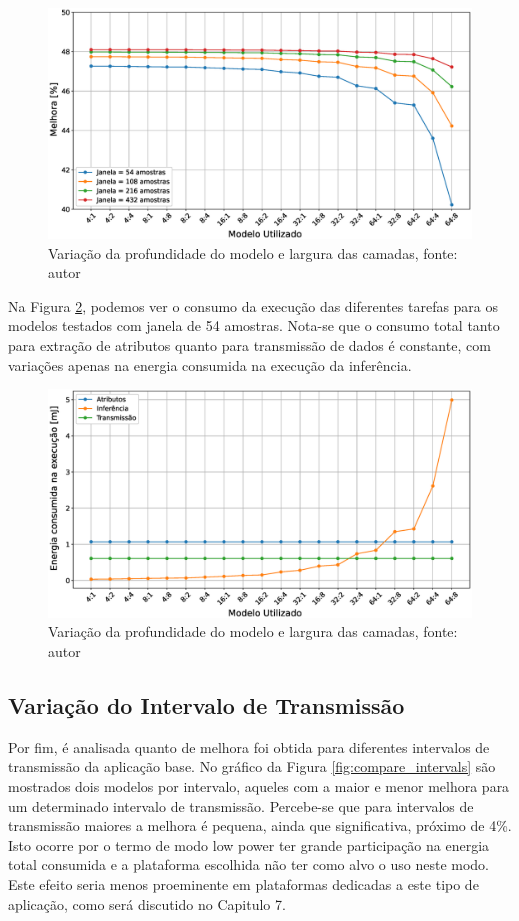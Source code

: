 \documentclass[a5paper]{ufsc-thesis}  %
\begin{document}
\begin{figure}[!ht]
    \centering
    \includegraphics[width=1\linewidth]{imagens/compare_datawindow.eps}
    \caption{Variação da profundidade do modelo e largura das camadas, fonte: autor}
    \label{fig:compare_datawindow}
\end{figure}

Na Figura \ref{fig:compare_tasks}, podemos ver o consumo da execução das diferentes tarefas para os modelos testados com janela de 54 amostras. Nota-se que o consumo total tanto para extração de atributos quanto para transmissão de dados é constante, com variações apenas na energia consumida na execução da inferência.

\begin{figure}[!ht]
    \centering
    \includegraphics[width=1\linewidth]{imagens/compare_tasks.eps}
    \caption{Variação da profundidade do modelo e largura das camadas, fonte: autor}
    \label{fig:compare_tasks}
\end{figure}

\subsection{Variação do Intervalo de Transmissão}
Por fim, é analisada quanto de melhora foi obtida para diferentes intervalos de transmissão da aplicação base. No gráfico da Figura \ref{fig:compare_intervals} são mostrados dois modelos por intervalo, aqueles com a maior e menor melhora para um determinado intervalo de transmissão. Percebe-se que para intervalos de transmissão maiores a melhora é pequena, ainda que significativa, próximo de 4\%. Isto ocorre por o termo de modo low power ter grande participação na energia total consumida e a plataforma escolhida não ter como alvo o uso neste modo. Este efeito seria menos proeminente em plataformas dedicadas a este tipo de aplicação, como será discutido no Capitulo 7.
\end{document}
